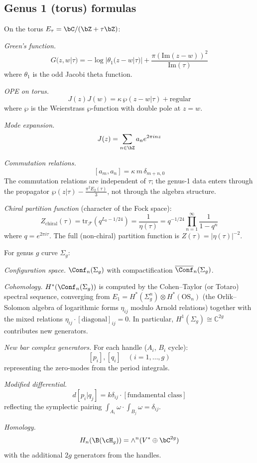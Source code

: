 \subsection{Genus 1 (torus) formulas}

\begin{computation}\label{comp:heisenberg-torus}
On the torus $E_\tau = \bC/(\bZ + \tau\bZ)$:

\emph{Green's function.}
\[
G(z, w | \tau) = -\log|\theta_1(z-w|\tau)| + \frac{\pi(\mathrm{Im}(z-w))^2}{\mathrm{Im}(\tau)}
\]
where $\theta_1$ is the odd Jacobi theta function.

\emph{OPE on torus.}
\[
J(z) J(w) = \kappa\,\wp(z-w|\tau) + \text{regular}
\]
where $\wp$ is the Weierstrass $\wp$-function with double pole at $z = w$.

\emph{Mode expansion.}
\[
J(z) = \sum_{n \in \bZ} a_n e^{2\pi i n z}
\]

\emph{Commutation relations.}
\[
[a_m, a_n] = \kappa\, m\,\delta_{m+n,0}
\]
The commutation relations are independent of $\tau$; the genus-1 data enters through the propagator $\wp(z|\tau) - \frac{\pi^2 E_2(\tau)}{3}$, not through the algebra structure.

\emph{Chiral partition function} (character of the Fock space):
\[
Z_{\mathrm{chiral}}(\tau) = \mathrm{tr}_{\mathcal{F}}(q^{L_0 - 1/24}) = \frac{1}{\eta(\tau)} = q^{-1/24} \prod_{n=1}^\infty \frac{1}{1 - q^n}
\]
where $q = e^{2\pi i \tau}$. The full (non-chiral) partition function is $Z(\tau) = |\eta(\tau)|^{-2}$.
\end{computation}


\begin{computation}\label{comp:bar-genus-g}
For genus $g$ curve $\Sigma_g$:

\emph{Configuration space.} $\Conf_n(\Sigma_g)$ with compactification
$\overline{\Conf}_n(\Sigma_g)$.

\emph{Cohomology.}
$H^*(\Conf_n(\Sigma_g))$ is computed by the Cohen--Taylor (or Totaro) spectral sequence, converging from $E_1 = H^*(\Sigma_g^n) \otimes H^*(\text{OS}_n)$ (the Orlik--Solomon algebra of logarithmic forms $\eta_{ij}$ modulo Arnold relations) together with the mixed relations $\eta_{ij} \cdot [\text{diagonal}]_{ij} = 0$. In particular, $H^1(\Sigma_g) \cong \mathbb{C}^{2g}$ contributes new generators.

\emph{New bar complex generators.} For each handle ($A_i$, $B_i$ cycle):
\[
[p_i], [q_i] \quad (i = 1, \ldots, g)
\]
representing the zero-modes from the period integrals.

\emph{Modified differential.}
\[
d[p_i | q_j] = k\delta_{ij} \cdot [\text{fundamental class}]
\]
reflecting the symplectic pairing $\int_{A_i} \omega \cdot \int_{B_j} \omega = \delta_{ij}$.

\emph{Homology.}
\[
H_n(\B(\cH_g)) = \wedge^n(V^* \oplus \bC^{2g})
\]
with the additional $2g$ generators from the handles.
\end{computation}


